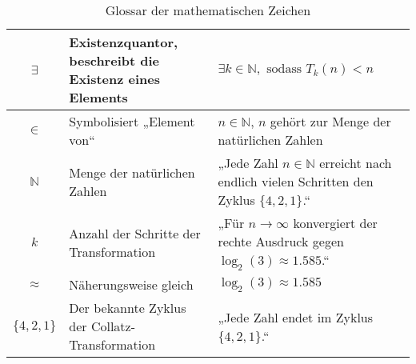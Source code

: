 \documentclass[a4paper,12pt]{article}
\begin{document}
\begin{table}[h!]
\begin{tabular}{|c|p{7cm}|p{5cm}|}
\( \exists \) & Existenzquantor, beschreibt die Existenz eines Elements & \( \exists k \in \mathbb{N}, \text{ sodass } T_k(n) < n \) \\ \hline
\( \in \) & Symbolisiert „Element von“ & \( n \in \mathbb{N} \), \( n \) gehört zur Menge der natürlichen Zahlen \\ \hline
\( \mathbb{N} \) & Menge der natürlichen Zahlen & „Jede Zahl \( n \in \mathbb{N} \) erreicht nach endlich vielen Schritten den Zyklus \( \{4, 2, 1\} \).“ \\ \hline
\( k \) & Anzahl der Schritte der Transformation & „Für \( n \to \infty \) konvergiert der rechte Ausdruck gegen \( \log_2(3) \approx 1.585 \).“ \\ \hline
\( \approx \) & Näherungsweise gleich & \( \log_2(3) \approx 1.585 \) \\ \hline
\( \{4, 2, 1\} \) & Der bekannte Zyklus der Collatz-Transformation & „Jede Zahl endet im Zyklus \( \{4, 2, 1\} \).“ \\ \hline
\end{tabular}
\caption{Glossar der mathematischen Zeichen}
\label{tab:glossar}
\end{table}
\end{document}
